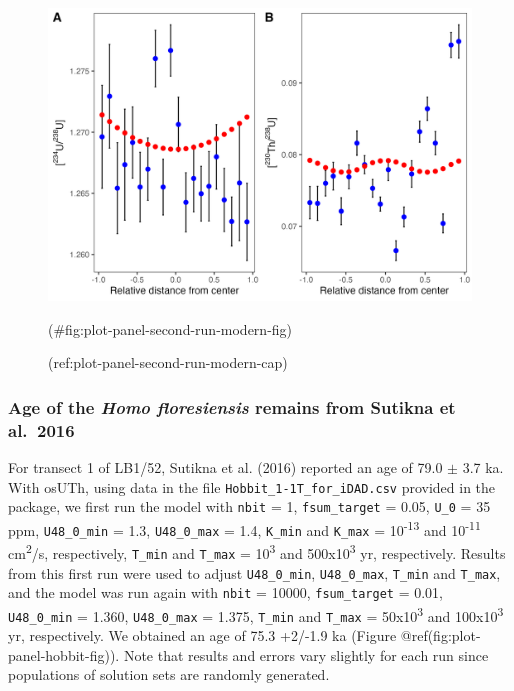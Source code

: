 \documentclass[]{elsarticle} %
\begin{document}
\begin{figure}
\includegraphics[width=1\linewidth]{figures/plot-panel-second-run-modern} \caption{(ref:plot-panel-second-run-modern-cap)}(\#fig:plot-panel-second-run-modern-fig)
\end{figure}

\FloatBarrier

\hypertarget{age-of-the-homo-floresiensis-remains-from-sutikna-et-al.-2016}{%
\subsubsection{\texorpdfstring{Age of the \emph{Homo floresiensis} remains from Sutikna et al.~2016}{Age of the Homo floresiensis remains from Sutikna et al.~2016}}\label{age-of-the-homo-floresiensis-remains-from-sutikna-et-al.-2016}}

For transect 1 of LB1/52, Sutikna et al. (2016) reported an age of 79.0 \(\pm\) 3.7 ka. With osUTh, using data in the file \texttt{Hobbit\_1-1T\_for\_iDAD.csv} provided in the package, we first run the model with \texttt{nbit} = 1, \texttt{fsum\_target} = 0.05, \texttt{U\_0} = 35 ppm, \texttt{U48\_0\_min} = 1.3, \texttt{U48\_0\_max} = 1.4, \texttt{K\_min} and \texttt{K\_max} = 10\textsuperscript{-13} and 10\textsuperscript{-11} cm\textsuperscript{2}/s, respectively, \texttt{T\_min} and \texttt{T\_max} = 10\textsuperscript{3} and 500x10\textsuperscript{3} yr, respectively. Results from this first run were used to adjust \texttt{U48\_0\_min}, \texttt{U48\_0\_max}, \texttt{T\_min} and \texttt{T\_max}, and the model was run again with \texttt{nbit} = 10000, \texttt{fsum\_target} = 0.01, \texttt{U48\_0\_min} = 1.360, \texttt{U48\_0\_max} = 1.375, \texttt{T\_min} and \texttt{T\_max} = 50x10\textsuperscript{3} and 100x10\textsuperscript{3} yr, respectively. We obtained an age of 75.3 +2/-1.9 ka (Figure @ref(fig:plot-panel-hobbit-fig)). Note that results and errors vary slightly for each run since populations of solution sets are randomly generated.
\end{document}
